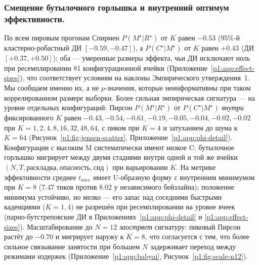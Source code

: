 \documentclass{article}
\begin{document}
\subsubsection{Смещение бутылочного горлышка и внутренний оптимум эффективности.}
По всем пировым прогонам Спирмен $P(M^\star|R^\star)$ от $K$ равен $-0.53$ (95\%-й кластерно-робастный ДИ $[-0.59,-0.47]$), а $P(C^\star|M^\star)$ от $K$ равен $+0.43$ (ДИ $[+0.37,+0.50]$); оба --- умеренные размеры эффекта, чьи ДИ исключают ноль при ресемплировании 81 конфигурационной ячейки (Приложение~\ref{p1:app:effect-sizes}), что соответствует условиям на наклоны Эмпирического утверждения~1. Мы сообщаем именно их, а не $p$-значения, которые неинформативны при таком коррелированном размере выборки. Более сильная эмпирическая сигнатура --- на уровне отдельных конфигураций: Пирсон $P(M^\star|R^\star)$ от $P(C^\star|M^\star)$ \emph{внутри} фиксированного $K$ равен $-0.43, -0.54, -0.61, -0.19, -0.05, -0.04, -0.02, -0.02$ при $K{=}1,2,4,8,16,32,48,64$, с пиком при $K{=}4$ и затуханием до шума к $K{=}64$ (Рисунок~\ref{p1:fig:jensen-scatter}, Приложение~\ref{p1:app:phi-detail}). Конфигурации с высоким M систематически имеют низкое C: бутылочное горлышко мигрирует между двумя стадиями внутри одной и той же ячейки $(N,T,\text{раскладка},\text{опасность},\text{сид})$ при варьировании $K$. На метрике эффективности среднее $t_{\mathrm{succ}}$ имеет U-образную форму с внутренним минимумом при $K{=}8$ (7.47 тиков против 8.02 у независимого бейзлайна); положение минимума устойчиво, но мелко --- его запас над соседними быстрыми каденциями ($K{=}1,4$) не разрешён при ресемплировании на уровне ячеек (парно-бутстреповские ДИ в Приложениях~\ref{p1:app:phi-detail} и \ref{p1:app:effect-sizes}). Масштабирование до $N{=}12$ \emph{заостряет} сигнатуру: пиковый Пирсон растёт до $-0.70$ и
мигрирует наружу к $K\!=\!8$, что согласуется с тем, что более сильное связывание
занятости при большем $N$ задерживает переход между режимами издержек
(Приложение~\ref{p1:app:babyai}, Рисунок~\ref{p1:fig:scale-n12}).
\end{document}
